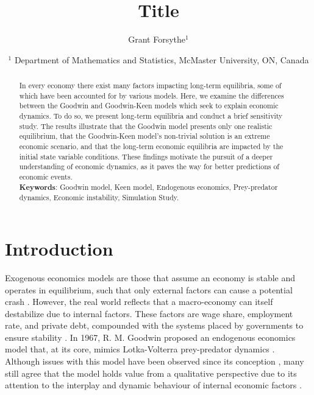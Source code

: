 \documentclass[12pt, centerh1]{article}
\title{Title} %
\author{\qquad Grant Forsythe$^{1}$}
\date{
{\footnotesize
$^1$ Department of Mathematics and Statistics, McMaster University, ON, Canada\\[-6pt]}
}
\begin{document}
\maketitle
\vspace{-8mm} %
\begin{abstract}
In every economy there exist many factors impacting long-term equilibria, some of which have been accounted for by various models. Here, we examine the differences between the Goodwin and Goodwin-Keen models which seek to explain economic dynamics. To do so, we present long-term equilibria and conduct a brief sensitivity study. The results illustrate that the Goodwin model presents only one realistic equilibrium, that the Goodwin-Keen model's non-trivial solution is an extreme economic scenario, and that the long-term economic equilibria are impacted by the initial state variable conditions. These findings motivate the pursuit of a deeper understanding of economic dynamics, as it paves the way for better predictions of economic events. \\ \textbf{Keywords}: Goodwin model, Keen model, Endogenous economics, Prey-predator dynamics, Economic instability, Simulation Study.

\end{abstract}
\newpage

\section{Introduction}
\noindent Exogenous economics models are those that assume an economy is stable and operates in equilibrium, such that only external factors can cause a potential crash \citep{ganti_2019}. However, the real world reflects that a macro-economy can itself destabilize due to internal factors. These factors are wage share, employment rate, and private debt, compounded with the systems placed by governments to ensure stability \citep{minsky1992financial}. In 1967, R. M. Goodwin proposed an endogenous economics model that, at its core, mimics Lotka-Volterra prey-predator dynamics \citep{goodwin1982growth}. Although issues with this model have been observed since its conception \citep{harvie2000testing}, many still agree that the model holds value from a qualitative perspective due to its attention to the interplay and dynamic behaviour of internal economic factors \citep{flaschel2016mathematical}. 
\end{document}
